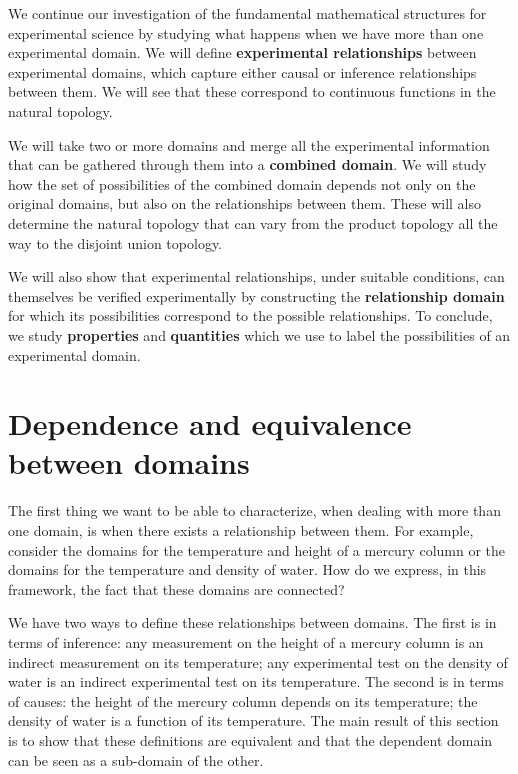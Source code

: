 \documentclass[11pt,letterpaper,fleqn]{memoir} %
\begin{document}
We continue our investigation of the fundamental mathematical structures for experimental science by studying what happens when we have more than one experimental domain. We will define \textbf{experimental relationships} between experimental domains, which capture either causal or inference relationships between them. We will see that these correspond to continuous functions in the natural topology.

We will take two or more domains and merge all the experimental information that can be gathered through them into a \textbf{combined domain}. We will study how the set of possibilities of the combined domain depends not only on the original domains, but also on the relationships between them. These will also determine the natural topology that can vary from the product topology all the way to the disjoint union topology.

We will also show that experimental relationships, under suitable conditions, can themselves be verified experimentally by constructing the \textbf{relationship domain} for which its possibilities correspond to the possible relationships. To conclude, we study \textbf{properties} and \textbf{quantities} which we use to label the possibilities of an experimental domain.

\section{Dependence and equivalence between domains}

The first thing we want to be able to characterize, when dealing with more than one domain, is when there exists a relationship between them. For example, consider the domains for the temperature and height of a mercury column or the domains for the temperature and density of water. How do we express, in this framework, the fact that these domains are connected?

We have two ways to define these relationships between domains. The first is in terms of inference: any measurement on the height of a mercury column is an indirect measurement on its temperature; any experimental test on the density of water is an indirect experimental test on its temperature. The second is in terms of causes: the height of the mercury column depends on its temperature; the density of water is a function of its temperature. The main result of this section is to show that these definitions are equivalent and that the dependent domain can be seen as a sub-domain of the other.
\end{document}
